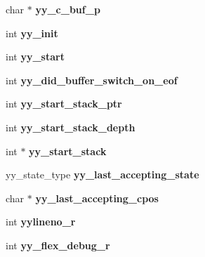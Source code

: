 \begin{DoxyCompactItemize}
\item 
\hypertarget{structyyguts__t_ab16b470329472d275439c4a3ab1b8c9f}{
char $\ast$ {\bfseries yy\_\-c\_\-buf\_\-p}}
\label{structyyguts__t_ab16b470329472d275439c4a3ab1b8c9f}

\item 
\hypertarget{structyyguts__t_aeae6dabf9dcc4769518ecf054181b1c8}{
int {\bfseries yy\_\-init}}
\label{structyyguts__t_aeae6dabf9dcc4769518ecf054181b1c8}

\item 
\hypertarget{structyyguts__t_a2e1e1d9ee4610a6679d49ed8194b00af}{
int {\bfseries yy\_\-start}}
\label{structyyguts__t_a2e1e1d9ee4610a6679d49ed8194b00af}

\item 
\hypertarget{structyyguts__t_a57edb4569f96dcfce9deaff0eb6a6412}{
int {\bfseries yy\_\-did\_\-buffer\_\-switch\_\-on\_\-eof}}
\label{structyyguts__t_a57edb4569f96dcfce9deaff0eb6a6412}

\item 
\hypertarget{structyyguts__t_a34dbf3316e47b7ec6bdc203e4ee87d4d}{
int {\bfseries yy\_\-start\_\-stack\_\-ptr}}
\label{structyyguts__t_a34dbf3316e47b7ec6bdc203e4ee87d4d}

\item 
\hypertarget{structyyguts__t_abc3da050f523ea26b13d241f83ab6540}{
int {\bfseries yy\_\-start\_\-stack\_\-depth}}
\label{structyyguts__t_abc3da050f523ea26b13d241f83ab6540}

\item 
\hypertarget{structyyguts__t_ab72c9c047c24c12633bcd6d7e2092f6d}{
int $\ast$ {\bfseries yy\_\-start\_\-stack}}
\label{structyyguts__t_ab72c9c047c24c12633bcd6d7e2092f6d}

\item 
\hypertarget{structyyguts__t_a1e8856234732c99be24858b0073e1297}{
yy\_\-state\_\-type {\bfseries yy\_\-last\_\-accepting\_\-state}}
\label{structyyguts__t_a1e8856234732c99be24858b0073e1297}

\item 
\hypertarget{structyyguts__t_ada05fbae68c8feadc86f149ae2a776ea}{
char $\ast$ {\bfseries yy\_\-last\_\-accepting\_\-cpos}}
\label{structyyguts__t_ada05fbae68c8feadc86f149ae2a776ea}

\item 
\hypertarget{structyyguts__t_ae8c340b82a1c079ec8135ccbf74c228e}{
int {\bfseries yylineno\_\-r}}
\label{structyyguts__t_ae8c340b82a1c079ec8135ccbf74c228e}

\item 
\hypertarget{structyyguts__t_a9027c888955749f1723ff2f9fdf6cfff}{
int {\bfseries yy\_\-flex\_\-debug\_\-r}}
\label{structyyguts__t_a9027c888955749f1723ff2f9fdf6cfff}


\end{DoxyCompactItemize}
